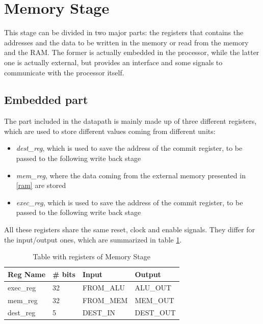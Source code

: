 \section{Memory Stage}
\label{chap_mem}
This stage can be divided in two major parts: the registers that contains the addresses and the data to be written in the memory or read from the memory and the RAM. The former is actually embedded in the processor, while the latter one is actually external, but provides an interface and some signals to communicate with the processor itself. 
\subsection{Embedded part}
The part included in the datapath is mainly made up of three different registers, which are used to store different values coming from different units:
\begin{itemize}
	\item \textit{dest\_reg}, which is used to save the address of the commit register, to be passed to the following write back stage
	\item \textit{mem\_reg}, where the data coming from the external memory presented in \ref{ram} are stored 
	\item \textit{exec\_reg}, which is used to save the address of the commit register, to be passed to the following write back stage
\end{itemize}
All these registers share the same reset, clock and enable signals. They differ for the input/output ones, which are summarized in table \ref{reg_table}.

\begin{table}[]
	\centering
	\begin{tabular}{llll}
		\toprule
		Reg Name  & \#  bits & Input     & Output   \\
		\midrule
		exec\_reg & 32       & FROM\_ALU & ALU\_OUT  \\
		mem\_reg  & 32       & FROM\_MEM & MEM\_OUT  \\
		dest\_reg & 5        & DEST\_IN  & DEST\_OUT \\
		\bottomrule
	\end{tabular}
	\caption{Table with registers of Memory Stage}
	\label{reg_table}
\end{table}

